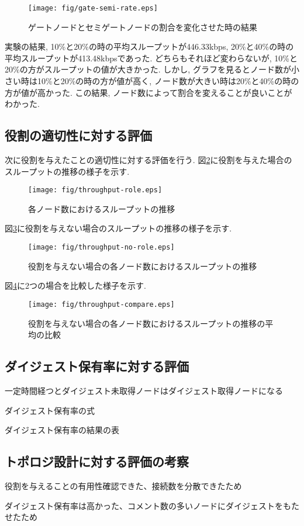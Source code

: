 \begin{figure}[h]
  \centering
  \texttt{[image: fig/gate-semi-rate.eps]}
  \caption{ゲートノードとセミゲートノードの割合を変化させた時の結果}
  \label{fig:gate-semi-rate}
\end{figure}

実験の結果, 10\%と20\%の時の平均スループットが446.33kbps, 20\%と40\%の時の平均スループットが413.48kbpsであった. どちらもそれほど変わらないが, 10\%と20\%の方がスループットの値が大きかった. しかし, グラフを見るとノード数が小さい時は10\%と20\%の時の方が値が高く, ノード数が大きい時は20\%と40\%の時の方が値が高かった. この結果, ノード数によって割合を変えることが良いことがわかった.

\subsection{役割の適切性に対する評価}
次に役割を与えたことの適切性に対する評価を行う. 図\ref{fig:throughput-role}に役割を与えた場合のスループットの推移の様子を示す.

\begin{figure}[h]
  \centering
  \texttt{[image: fig/throughput-role.eps]}
  \caption{各ノード数におけるスループットの推移}
  \label{fig:throughput-role}
\end{figure}

\newpage

図\ref{fig:throughput-no-role}に役割を与えない場合のスループットの推移の様子を示す.

\begin{figure}[h]
  \centering
  \texttt{[image: fig/throughput-no-role.eps]}
  \caption{役割を与えない場合の各ノード数におけるスループットの推移}
  \label{fig:throughput-no-role}
\end{figure}

\newpage

図\ref{fig:throughput-compare}に2つの場合を比較した様子を示す.

\begin{figure}[h]
  \centering
  \texttt{[image: fig/throughput-compare.eps]}
  \caption{役割を与えない場合の各ノード数におけるスループットの推移の平均の比較}
  \label{fig:throughput-compare}
\end{figure}

\newpage

\subsection{ダイジェスト保有率に対する評価}
一定時間経つとダイジェスト未取得ノードはダイジェスト取得ノードになる

ダイジェスト保有率の式

ダイジェスト保有率の結果の表

\subsection{トポロジ設計に対する評価の考察}
役割を与えることの有用性確認できた、接続数を分散できたため

ダイジェスト保有率は高かった、コメント数の多いノードにダイジェストをもたせたため

